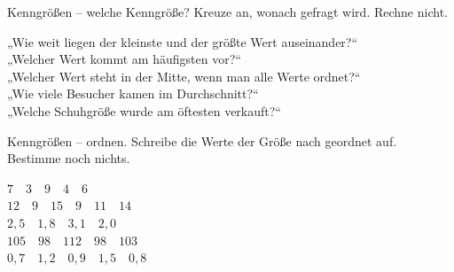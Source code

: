 \setcounter{aufgabe}{28}

\begin{aufgabe}{Kenngrößen -- welche Kenngröße? Kreuze an, wonach gefragt wird. Rechne nicht.}
\begin{teile}
\teil „Wie weit liegen der kleinste und der größte Wert auseinander?“ \\ 
\teil „Welcher Wert kommt am häufigsten vor?“ \\ 
\teil „Welcher Wert steht in der Mitte, wenn man alle Werte ordnet?“ \\ 
\teil „Wie viele Besucher kamen im Durchschnitt?“ \\ 
\teil „Welche Schuhgröße wurde am öftesten verkauft?“ \\ 
\end{teile}
\end{aufgabe}

\begin{aufgabe}{Kenngrößen -- ordnen. Schreibe die Werte der Größe nach geordnet auf. Bestimme noch nichts.}
\begin{teile}
\teil $7 \quad 3 \quad 9 \quad 4 \quad 6$ \\[10pt]
\teil $12 \quad 9 \quad 15 \quad 9 \quad 11 \quad 14$ \\[10pt]
\teil $2{,}5 \quad 1{,}8 \quad 3{,}1 \quad 2{,}0$ \\[10pt]
\teil $105 \quad 98 \quad 112 \quad 98 \quad 103$ \\[10pt]
\teil $0{,}7 \quad 1{,}2 \quad 0{,}9 \quad 1{,}5 \quad 0{,}8$ \\[10pt]
\end{teile}
\end{aufgabe}

